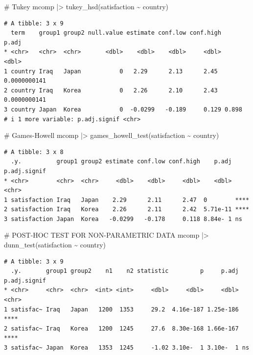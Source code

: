 \documentclass[
  letterpaper,
]{krantz}
\makeatletter
\newenvironment{Shaded}{\begin{snugshade}}{\end{snugshade}}
\newcommand{\AlertTok}[1]{\textcolor[rgb]{0.68,0.00,0.00}{#1}}
\newcommand{\CommentTok}[1]{\textcolor[rgb]{0.37,0.37,0.37}{#1}}
\newcommand{\FunctionTok}[1]{\textcolor[rgb]{0.28,0.35,0.67}{#1}}
\newcommand{\NormalTok}[1]{\textcolor[rgb]{0.00,0.23,0.31}{#1}}
\newcommand{\SpecialCharTok}[1]{\textcolor[rgb]{0.37,0.37,0.37}{#1}}
\newenvironment{kframe}{%
\medskip{}
\setlength{\fboxsep}{.8em}
 \def\at@end@of@kframe{}%
 \ifinner\ifhmode%
  \def\at@end@of@kframe{\end{minipage}}%
  \begin{minipage}{\columnwidth}%
 \fi\fi%
 \def\FrameCommand##1{\hskip\@totalleftmargin \hskip-\fboxsep
 \colorbox{shadecolor}{##1}\hskip-\fboxsep
     \hskip-\linewidth \hskip-\@totalleftmargin \hskip\columnwidth}%
 \MakeFramed {\advance\hsize-\width
   \@totalleftmargin\z@ \linewidth\hsize
   \@setminipage}}%
 {\par\unskip\endMakeFramed%
 \at@end@of@kframe}
\renewenvironment{Shaded}{\begin{kframe}}{\end{kframe}}
\makeatother
\begin{document}
\begin{Shaded}
\begin{Highlighting}[]
\CommentTok{\# Tukey}
\NormalTok{mcomp }\SpecialCharTok{|\textgreater{}} \FunctionTok{tukey\_hsd}\NormalTok{(satisfaction }\SpecialCharTok{\textasciitilde{}}\NormalTok{ country)}
\end{Highlighting}
\end{Shaded}

\begin{verbatim}
# A tibble: 3 x 9
  term    group1 group2 null.value estimate conf.low conf.high        p.adj
* <chr>   <chr>  <chr>       <dbl>    <dbl>    <dbl>     <dbl>        <dbl>
1 country Iraq   Japan           0   2.29      2.13      2.45  0.0000000141
2 country Iraq   Korea           0   2.26      2.10      2.43  0.0000000141
3 country Japan  Korea           0  -0.0299   -0.189     0.129 0.898       
# i 1 more variable: p.adj.signif <chr>
\end{verbatim}

\begin{Shaded}
\begin{Highlighting}[]
\CommentTok{\# Games{-}Howell}
\NormalTok{mcomp }\SpecialCharTok{|\textgreater{}} \FunctionTok{games\_howell\_test}\NormalTok{(satisfaction }\SpecialCharTok{\textasciitilde{}}\NormalTok{ country)}
\end{Highlighting}
\end{Shaded}

\begin{verbatim}
# A tibble: 3 x 8
  .y.          group1 group2 estimate conf.low conf.high    p.adj p.adj.signif
* <chr>        <chr>  <chr>     <dbl>    <dbl>     <dbl>    <dbl> <chr>       
1 satisfaction Iraq   Japan    2.29      2.11      2.47  0        ****        
2 satisfaction Iraq   Korea    2.26      2.11      2.42  5.71e-11 ****        
3 satisfaction Japan  Korea   -0.0299   -0.178     0.118 8.84e- 1 ns          
\end{verbatim}

\begin{Shaded}
\begin{Highlighting}[]
\CommentTok{\# POST{-}HOC }\AlertTok{TEST}\CommentTok{ FOR NON{-}PARAMETRIC DATA}
\NormalTok{mcomp }\SpecialCharTok{|\textgreater{}} \FunctionTok{dunn\_test}\NormalTok{(satisfaction }\SpecialCharTok{\textasciitilde{}}\NormalTok{ country)}
\end{Highlighting}
\end{Shaded}

\begin{verbatim}
# A tibble: 3 x 9
  .y.       group1 group2    n1    n2 statistic         p     p.adj p.adj.signif
* <chr>     <chr>  <chr>  <int> <int>     <dbl>     <dbl>     <dbl> <chr>       
1 satisfac~ Iraq   Japan   1200  1353     29.2  4.16e-187 1.25e-186 ****        
2 satisfac~ Iraq   Korea   1200  1245     27.6  8.30e-168 1.66e-167 ****        
3 satisfac~ Japan  Korea   1353  1245     -1.02 3.10e-  1 3.10e-  1 ns          
\end{verbatim}
\end{document}
